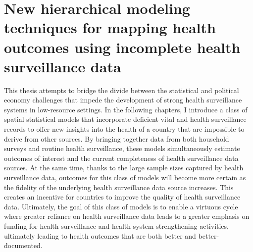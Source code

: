 \documentclass[
]{report}
\begin{document}
\hypertarget{new-hierarchical-modeling-techniques-for-mapping-health-outcomes-using-incomplete-health-surveillance-data}{%
\section{New hierarchical modeling techniques for mapping health outcomes using incomplete health surveillance data}\label{new-hierarchical-modeling-techniques-for-mapping-health-outcomes-using-incomplete-health-surveillance-data}}

This thesis attempts to bridge the divide between the statistical and political economy challenges that impede the development of strong health surveillance systems in low-resource settings. In the following chapters, I introduce a class of spatial statistical models that incorporate deficient vital and health surveillance records to offer new insights into the health of a country that are impossible to derive from other sources. By bringing together data from both household surveys and routine health surveillance, these models simultaneously estimate outcomes of interest and the current completeness of health surveillance data sources. At the same time, thanks to the large sample sizes captured by health surveillance data, outcomes for this class of models will become more certain as the fidelity of the underlying health surveillance data source increases. This creates an incentive for countries to improve the quality of health surveillance data. Ultimately, the goal of this class of models is to enable a virtuous cycle where greater reliance on health surveillance data leads to a greater emphasis on funding for health surveillance and health system strengthening activities, ultimately leading to health outcomes that are both better and better-documented.
\end{document}
